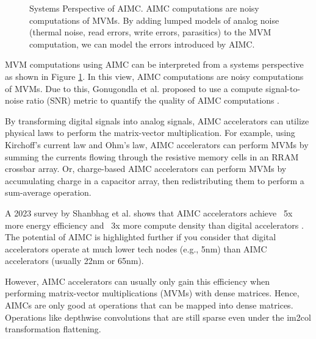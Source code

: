 \begin{figure}[htbp]
    \centering
    
    \caption{Systems Perspective of AIMC. AIMC computations are noisy computations of MVMs. By adding lumped models of analog noise (thermal noise, read errors, write errors, parasitics) to the MVM computation, we can model the errors introduced by AIMC.}
    \label{fig:aimc_system}
\end{figure}

MVM computations using AIMC can be interpreted from a systems perspective as shown in Figure \ref{fig:aimc_system}. In this view, AIMC computations are noisy computations of MVMs. Due to this, Gonugondla et al. proposed to use a compute signal-to-noise ratio (SNR) metric to quantify the quality of AIMC computations \cite{gonugondla2020fundamental}.  

By transforming digital signals into analog signals, AIMC accelerators can utilize physical laws to perform the matrix-vector multiplication. For example, using Kirchoff's current law and Ohm's law, AIMC accelerators can perform MVMs by summing the currents flowing through the resistive memory cells in an RRAM crossbar array. Or, charge-based AIMC accelerators can perform MVMs by accumulating charge in a capacitor array, then redistributing them to perform a sum-average operation.

A 2023 survey by Shanbhag et al. shows that AIMC accelerators achieve ~5x more energy efficiency and ~3x more compute density than digital accelerators \cite{shanbhag2022benchmarking}. The potential of AIMC is highlighted further if you consider that digital accelerators operate at much lower tech nodes (e.g., 5nm) than AIMC accelerators (usually 22nm or 65nm).

However, AIMC accelerators can usually only gain this efficiency when performing matrix-vector multiplications (MVMs) with dense matrices. Hence, AIMCs are only good at operations that can be mapped into dense matrices. Operations like depthwise convolutions \cite{howard2017mobilenets} that are still sparse even under the im2col transformation flattening. 